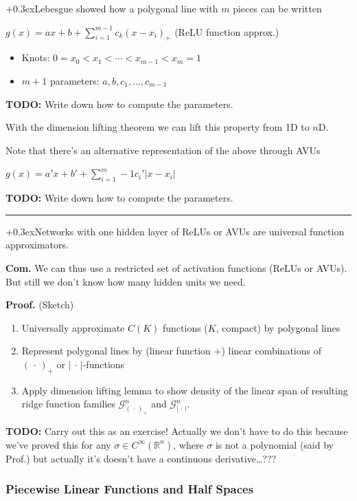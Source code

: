 \documentclass[a2paper,4pt]{extarticle}
\newcommand{\R}{\mathbb{R}}
\newcommand{\cG}{\mathcal{G}}
\newcommand{\abs}[1]{\left\lvert #1 \right\rvert}
\newcommand{\argdot}{\,\cdot\,}
\newcommand{\todo}[1]{\textbf{TODO:} #1}
\newcommand{\todo}[1]{%
}
\newcommand{\customboxpaddingsize}{0pt}
\newcommand{\emptyarg}[1][]{\ifthenelse{\isempty{#1}}{}{\ (#1)}}
\newcommand{\Thm}[1][]{{\setlength\fboxsep{\customboxpaddingsize}
\colorbox{thmcolor}{%
\color{custtitlecolor}{\textbf{T.\emptyarg[#1]}}}\kern+0.3ex}}
\newcommand{\Com}{\textbf{Com.} }
\newcommand{\Proof}{\textbf{Proof.} }
\newcommand{\sep}{\vspace{0pt}\noindent\hrule\vspace{0pt}}
\newcommand{\ssep}{\hdashrule[1.1ex]{\linewidth}{0.1pt}{0.3mm}\vspace{-6pt}}
\newcommand{\sep}{\vspace{5pt}\noindent\hrule\vspace{5pt}}
\newcommand{\ssep}{\hdashrule[1.1ex]{\linewidth}{0.1pt}{0.3mm}\vspace{-3pt}}
\begin{document}
\begin{landscape}
\begin{multicols*}{7}
\Thm Lebesgue showed how a polygonal line with $m$ pieces can be written 

$
\displaystyle
g(x)=ax+b+\sum_{i=1}^{m-1} c_k(x-x_i)_{+}
$ (ReLU function approx.)

\begin{itemize}
  \item Knots: $0=x_0<x_1<\cdots <x_{m-1}<x_{m}=1$
  \item $m+1$ parameters: $a,b,c_1,\ldots,c_{m-1}$
\end{itemize}

\todo{Write down how to compute the parameters}.

With the dimension lifting theorem we can lift this property from 1D to $n$D.

\ssep

Note that there's an alternative representation of the above through AVUs

$
g(x)=a'x+b'+\sum_{i=1}^m-1 c_i'\abs{x-x_i}
$

\todo{Write down how to compute the parameters}.

\sep

\Thm Networks with one hidden layer of ReLUs or AVUs are universal function
approximators.

\Com We can thus use a restricted set of activation functions (ReLUs or AVUs).
But still we don't know how many hidden units we need.

\Proof (Sketch)

\begin{enumerate}
  \item Universally approximate $C(K)$ functions ($K$, compact) by polygonal
  lines
  \item Represent polygonal lines by (linear function $+$) linear combinations
  of $(\argdot)_+$ or $\abs{\argdot}$-functions
  \item Apply dimension lifting lemma to show density of the linear span of
  resulting ridge function families $\cG_{(\argdot)_{+}}^n$ and
  $\cG_{\abs{\argdot}}^n$.
\end{enumerate}

\todo{Carry out this as an exercise! Actually we don't have to do this because
we've proved this for any $\sigma\in C^{\infty}(\R^n)$, where $\sigma$ is not a
polynomial (said by Prof.) but actually it's doesn't have a continuous
derivative\ldots???}

\subsubsection{Piecewise Linear Functions and Half Spaces}


\end{multicols*}
\end{landscape}
\end{document}
